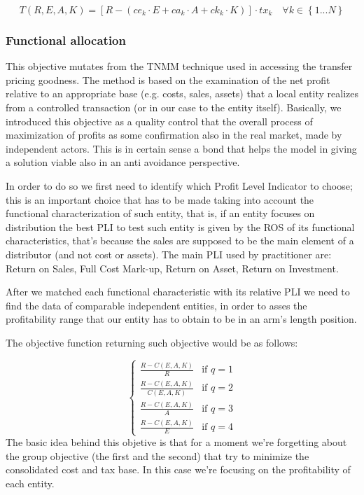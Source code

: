 \documentclass{article}
\begin{document}
\[
T(R,E,A,K)= [R-(ce_k\cdot E+ca_k\cdot A+ck_k\cdot K)]\cdot tx_k \quad \forall k \in \left\{1...N\right\}
\]

\subsubsection{Functional allocation}
This objective mutates from the TNMM technique used in accessing the transfer pricing goodness. The method is based on the examination of the net profit relative to an appropriate base (e.g. costs, sales, assets) that a local entity realizes from a controlled transaction (or in our case to the entity itself). Basically, we introduced this objective as a quality control that the overall process of maximization of profits as some confirmation also in the real market, made by independent actors. This is in certain sense a bond that helps the model in giving a solution viable also in an anti avoidance perspective.

In order to do so we first need to identify which Profit Level Indicator to choose; this is an important choice that has to be made taking into account the functional characterization of such entity, that is, if an entity focuses on distribution the best PLI to test such entity is given by the ROS of its functional characteristics, that's because the sales are supposed to be the main element of a distributor (and not cost or assets). The main PLI used by practitioner are: Return on Sales, Full Cost Mark-up, Return on Asset, Return on Investment.

After we matched each functional characteristic with its relative PLI we need to find the data of comparable independent entities, in order to asses the profitability range that our entity has to obtain to be in an arm's length position.

The objective function returning such objective would be as follows:

\[
\begin{cases}
   \frac{R - C(E,A,K)}{R} & \text{if } q=1
   \\
   \frac{R - C(E,A,K)}{C(E,A,K)} & \text{if } q=2
   \\
   \frac{R - C(E,A,K)}{A} & \text{if } q=3
   \\
   \frac{R - C(E,A,K)}{E} & \text{if } q=4
\end{cases}
\]
The basic idea behind this objetive is that for a moment we're forgetting about the group objective (the first and the second) that try to minimize the consolidated cost and tax base. In this case we're focusing on the profitability of each entity.
\end{document}
